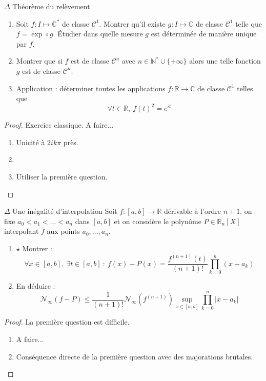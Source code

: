 \documentclass[french,a4paper]{article}
\newcommand{\N}{\mathbb{N}}
\newcommand{\R}{\mathbb{R}}
\newcommand{\C}{\mathbb{C}}
\newcommand{\st}{^*}
\theoremstyle{plain}
\theoremstyle{definition}
\theoremstyle{remark}
\begin{document}
\begin{ex}[Moulin.FV.18]{$\Delta$ Théorème du relèvement}
	\begin{enumerate}
		\item Soit $f:I\mapsto\C\st$ de classe $\mathcal{C}^1$. Montrer qu'il existe $g:I\mapsto\C$ de classe $\mathcal{C}^1$ telle que $f=\exp\circ g$. Étudier dans quelle mesure $g$ est déterminée de manière unique par $f$.
		\item Montrer que si $f$ est de classe $\mathcal{C}^n$ avec $n\in\N\st\cup\{+\infty\}$ alors une telle fonction $g$ est de classe $\mathcal{C}^n$.
		\item Application : déterminer toutes les applications $f:\R\to\C$ de classe $\mathcal{C}^1$ telles que $$\forall t\in\R,\ f(t)^2=e^{it}$$
	\end{enumerate}
\end{ex}
\begin{proof}
	Exercice classique. A faire...
	\begin{enumerate}
		\item Unicité à $2ik\pi$ près.
		\item 
		\item Utiliser la première question.
	\end{enumerate}
\end{proof}

\begin{ex}[Moulin.FV.19]{$\Delta$ Une inégalité d'interpolation}
	Soit $f:[a,b]\to\R$ dérivable à l'ordre $n+1$. on fixe $a_0<a_1<\ldots<a_n$ dans $[a,b]$ et on considère le polynôme $P\in\R_n[X]$ interpolant $f$ aux points $a_0,\ldots,a_n$.
	\begin{enumerate}
		\item $\star$ Montrer : $$\forall x\in[a,b],\ \exists t\in[a,b]\ :\ f(x)-P(x)=\frac{f^{(n+1)}(t)}{(n+1)!}\prod_{k=0}^{n}(x-a_k)$$
		\item En déduire : $$\mathcal{N}_\infty(f-P)\leqslant\frac{1}{(n+1)!}\mathcal{N}_\infty(f^{(n+1)})\underset{x\in[a,b]}{\sup}\prod_{k=0}^{n}\lvert x-a_k\rvert$$
	\end{enumerate}
\end{ex}
\begin{proof}
	La première question est difficile.
	\begin{enumerate}
		\item A faire...
		\item Conséquence directe de la première question avec des majorations brutales.
	\end{enumerate}
\end{proof}
\end{document}
